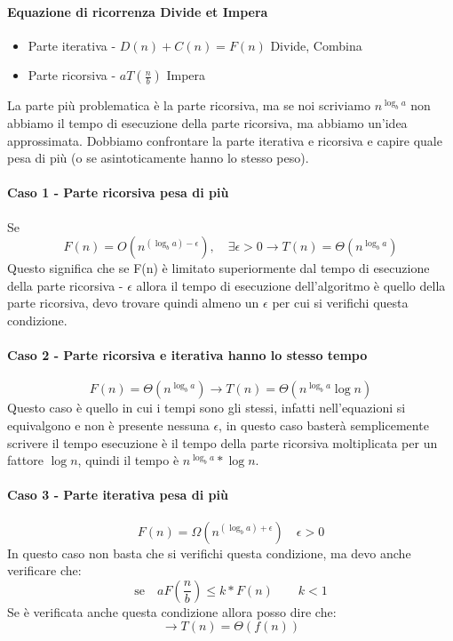 \paragraph*{Equazione di ricorrenza Divide et Impera}
\begin{itemize}
    \item Parte iterativa - $D(n)+C(n)=F(n)$ Divide, Combina
    \item Parte ricorsiva - $aT(\frac{n}{b})$ Impera
\end{itemize}
La parte più problematica è la parte ricorsiva, ma se noi scriviamo $n^{\log_b a}$ non abbiamo
il tempo di esecuzione della parte ricorsiva, ma abbiamo un'idea approssimata. Dobbiamo confrontare
la parte iterativa e ricorsiva e capire quale pesa di più (o se asintoticamente hanno lo stesso peso).
\paragraph*{Caso 1 - Parte ricorsiva pesa di più} Se 
\begin{equation*}
    F(n)=O(n^{(\log_b a)-\epsilon}), \quad \exists \epsilon>0 \rightarrow T(n) = \Theta(n^{\log_b a})
\end{equation*}
Questo significa che se F(n) è limitato superiormente dal tempo di esecuzione della parte ricorsiva - $\epsilon$
allora il tempo di esecuzione dell'algoritmo è quello della parte ricorsiva, devo trovare quindi almeno un 
$\epsilon$ per cui si verifichi questa condizione.
\paragraph*{Caso 2 - Parte ricorsiva e iterativa hanno lo stesso tempo}
\begin{equation*}
    F(n)=\Theta(n^{\log_b a}) \rightarrow T(n) = \Theta(n^{\log_b a}\log n)
\end{equation*}
Questo caso è quello in cui i tempi sono gli stessi, infatti nell'equazioni si equivalgono e non
è presente nessuna $\epsilon$, in questo caso basterà semplicemente scrivere il tempo esecuzione è il tempo
della parte ricorsiva moltiplicata per un fattore $\log n$, quindi il tempo è $n^{\log_b a}*\log n$.
\paragraph*{Caso 3 - Parte iterativa pesa di più}
\begin{equation*}
    F(n) = \Omega(n^{(\log_b a)+\epsilon}) \quad \epsilon>0
\end{equation*}
In questo caso non basta che si verifichi questa condizione, ma devo anche verificare che:
\begin{equation*}
    \text{se} \quad aF(\frac{n}{b})\leq k*F(n) \qquad k<1
\end{equation*}
Se è verificata anche questa condizione allora posso dire che:
\begin{equation*}
    \rightarrow T(n)= \Theta(f(n))
\end{equation*}
